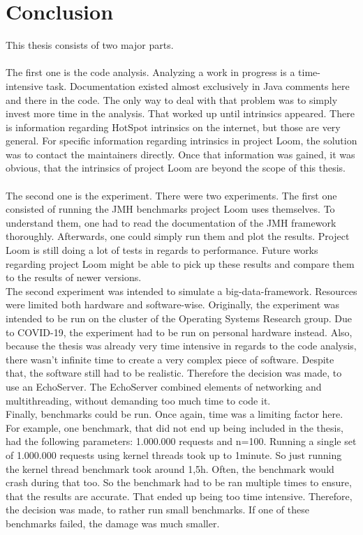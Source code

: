 \chapter{Conclusion}
This thesis consists of two major parts.
\\
\\
The first one is the code analysis. Analyzing a work in progress is a time-intensive task. Documentation existed almost exclusively in Java comments here and there in the code. The only way to deal with that problem was to simply invest more time in the analysis. That worked up until intrinsics appeared. There is information regarding HotSpot intrinsics on the internet, but those are very general. For specific information regarding intrinsics in project Loom, the solution was to contact the maintainers directly. Once that information was gained, it was obvious, that the intrinsics of project Loom are beyond the scope of this thesis.
\\
\\
The second one is the experiment. There were two experiments. The first one consisted of running the JMH benchmarks project Loom uses themselves. To understand them, one had to read the documentation of the JMH framework thoroughly. Afterwards, one could simply run them and plot the results. Project Loom is still doing a lot of tests in regards to performance. Future works regarding project Loom might be able to pick up these results and compare them to the results of newer versions.
\\
The second experiment was intended to simulate a big-data-framework. Resources were limited both hardware and software-wise. Originally, the experiment was intended to be run on the cluster of the Operating Systems Research group. Due to COVID-19, the experiment had to be run on personal hardware instead. Also, because the thesis was already very time intensive in regards to the code analysis, there wasn't infinite time to create a very complex piece of software. Despite that, the software still had to be realistic. Therefore the decision was made, to use an EchoServer. The EchoServer combined elements of networking and multithreading, without demanding too much time to code it.
\\
Finally, benchmarks could be run. Once again, time was a limiting factor here. For example, one benchmark, that did not end up being included in the thesis, had the following parameters: 1.000.000 requests and n=100. Running a single set of 1.000.000 requests using kernel threads took up to 1minute. So just running the kernel thread benchmark took around 1,5h. Often, the benchmark would crash during that too. So the benchmark had to be ran multiple times to ensure, that the results are accurate. That ended up being too time intensive. Therefore, the decision was made, to rather run small benchmarks. If one of these benchmarks failed, the damage was much smaller. 